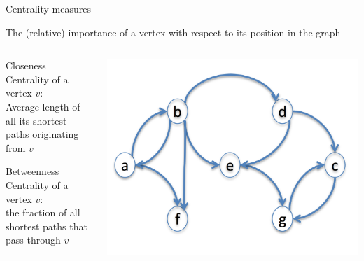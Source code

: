 \begin{frame}{Centrality measures}

\begin{definition}[Centrality]
The (relative) \alert{importance} of a vertex with respect to its position in the graph
\end{definition}

\begin{columns}
	\begin{column}{0.5\textwidth}
		\BI
			\item \alert{Closeness Centrality} of a vertex $v$: \\
			Average length of all its shortest paths originating from $v$
			\item \alert{Betweenness Centrality} of a vertex $v$: \\
			the fraction of all shortest paths that pass through $v$
		\EI
	\end{column}
	\begin{column}{0.5\textwidth}
		\includegraphics[width=\textwidth]{figs/xx/connectivity.png}
	\end{column}
\end{columns}


\end{frame}


